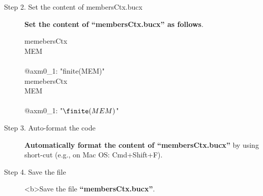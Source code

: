 \begin{description}
\item[Step 2. Set the content of membersCtx.bucx] \textbf{Set the content of ``membersCtx.bucx'' as follows}.
  \begin{center}
    \begin{Bcode}
      \ifplastex
      \Bcontext{} memebersCtx\\
      \Bsets{} MEM\\
      \Baxioms\\
      @axm0_1: "finite(MEM)"\\
      \Bend
      \else
      \Bcontext{} memebersCtx\\
      \Bsets{} MEM\\
      \Baxioms\\
      \Btab @axm0_1: "\(\finite(MEM)\)"\\
      \Bend
      \fi
    \end{Bcode}
  \end{center}

\item [Step 3. Auto-format the code] \textbf{Automatically format the content of ``membersCtx.bucx''} by using short-cut (e.g., on Mac OS: Cmd+Shift+F).

\item[Step 4. Save the file] <b>Save the file \textbf{``membersCtx.bucx''}.
\end{description}

